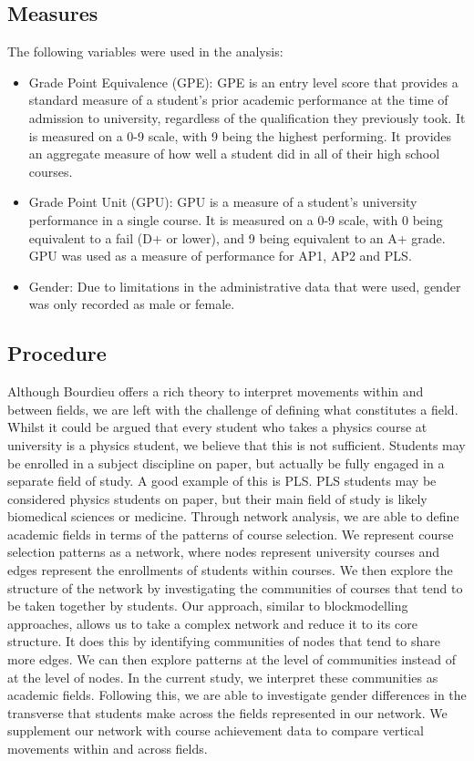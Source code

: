 \subsection*{Measures}

The following variables were used in the analysis:
\begin{itemize}
\item{Grade Point Equivalence (GPE):} GPE is an entry level score that provides a standard measure of a student’s prior academic performance at the time of admission to university, regardless of the qualification they previously took. It is measured on a 0-9 scale, with 9 being the highest performing. It provides an aggregate measure of how well a student did in all of their high school courses.\cite{UoA_2016}

\item{Grade Point Unit (GPU):} GPU is a measure of a student’s university performance in a single course. It is measured on a 0-9 scale, with 0 being equivalent to a fail (D+ or lower), and 9 being equivalent to an A+ grade. GPU was used as a measure of performance for AP1, AP2 and PLS.
	
\item{Gender:} Due to limitations in the administrative data that were used, gender was only recorded as male or female. 

\end{itemize}

\subsection*{Procedure}
Although Bourdieu offers a rich theory to interpret movements within and between fields, we are left with the challenge of defining what constitutes a field. Whilst it could be argued that every student who takes a physics course at university is a physics student, we believe that this is not sufficient. Students may be enrolled in a subject discipline on paper, but actually be fully engaged in a separate field of study. A good example of this is PLS. PLS students may be considered physics students on paper, but their main field of study is likely biomedical sciences or medicine. Through network analysis, we are able to define academic fields in terms of the patterns of course selection. We represent course selection patterns as a network, where nodes represent university courses and edges represent the enrollments of students within courses. We then explore the structure of the network by investigating the communities of courses that tend to be taken together by students. Our approach, similar to blockmodelling approaches\cite{bottero2011worlds,white1976social}, allows us to take a complex network and reduce it to its core structure. It does this by identifying communities of nodes that tend to share more edges. We can then explore patterns at the level of communities instead of at the level of nodes. In the current study, we interpret these communities as academic fields. Following this, we are able to investigate gender differences in the transverse that students make across the fields represented in our network. We supplement our network with course achievement data to compare vertical movements within and across fields. 

